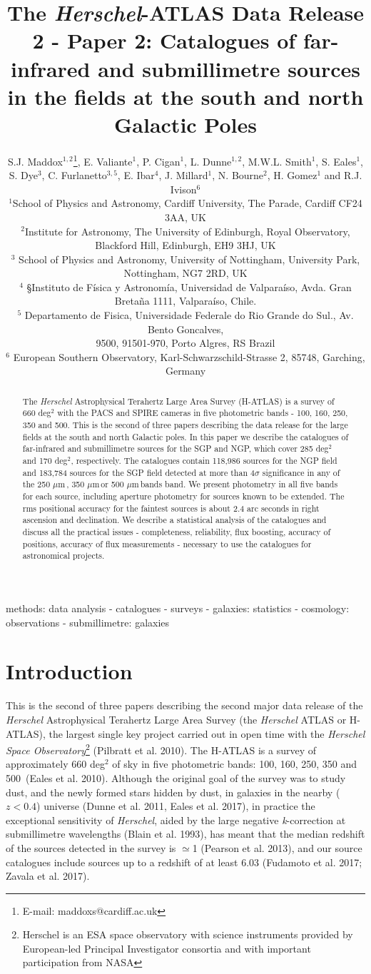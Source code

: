 \documentclass[useAMS,usenatbib]{mnras}
\title[The \textit{Herschel}-ATLAS Data Release 2]{The
  \textit{Herschel}-ATLAS Data Release 2 - Paper 2: Catalogues of
  far-infrared and submillimetre sources in the fields at the south
  and north Galactic Poles}
\author[S.J. Maddox]{S.J. Maddox$^{1,2}$\thanks{E-mail:
    maddoxs@cardiff.ac.uk}, E. Valiante$^1$, P. Cigan$^1$, 
  L. Dunne$^{1,2}$,
  \textsc{}\newauthor M.W.L. Smith$^1$, S. Eales$^1$, S. Dye$^3$,
  C. Furlanetto$^{3,5}$, E. Ibar$^4$, \newauthor
  J. Millard$^1$, N. Bourne$^2$, H. Gomez$^1$ and R.J. Ivison$^6$\\
  $^{1}$School of Physics and Astronomy, Cardiff University, The Parade, Cardiff CF24 3AA, UK\\
  $^2$Institute for Astronomy, The University of Edinburgh, Royal
  Observatory, Blackford Hill,
  Edinburgh, EH9 3HJ, UK\\
  $^3$ School of Physics and Astronomy, University of Nottingham,
  University Park, Nottingham,
  NG7 2RD, UK\\
  $^4$ §Instituto de F\'isica y Astronom\'ia, Universidad de Valpara\'iso, Avda. Gran Breta\~na 1111, Valpara\'iso, Chile.\\
  $^5$ Departamento de Fisica, Universidade Federale do Rio Grande do Sul., Av. Bento Goncalves,\\
  9500, 91501-970, Porto Algres, RS Brazil\\
  $^6$ European Southern Observatory, Karl-Schwarzschild-Strasse 2,
  85748, Garching, Germany}
\date{}
\def\mic{ $\mu $m\,}
\begin{document}
\label{firstpage}
\pagerange{\pageref{firstpage}--\pageref{lastpage}}
\maketitle


\begin{abstract}

The {\it Herschel} Astrophysical Terahertz Large Area Survey
(H-ATLAS) is a survey of 660 deg$^2$ with the PACS and SPIRE cameras
in five photometric bands - 100, 160, 250, 350 and 500\micron.
This is the second of three papers describing the data release
for the large fields at the south and north Galactic poles.
In this paper
we describe the catalogues of far-infrared and submillimetre
sources for the SGP and NGP, which cover 285 deg$^2$ and 170 deg$^2$,
respectively.
The catalogues contain
118,986 sources for the NGP field and 183,784 sources for the
SGP field detected at
more than 4$\sigma$ significance in any of the 250\mic, 350\mic or
500\mic bands band. We present photometry in all five bands for
each source, including aperture photometry for sources known to
be extended. 
The rms positional accuracy for the faintest
sources is about 2.4 arc seconds in right ascension and
declination.
We describe a statistical analysis of the catalogues
and discuss all the practical issues - completeness, reliability,
flux boosting, accuracy of positions, accuracy of flux measurements - necessary to
use the catalogues for astronomical projects.
\end{abstract}

\begin{keywords}
methods: data analysis - catalogues - surveys - galaxies: statistics - cosmology:
observations - submillimetre: galaxies
\end{keywords}

\section{Introduction}

This is the second of three papers describing the second major data
release of the {\it Herschel} Astrophysical Terahertz Large Area
Survey (the {\it Herschel} ATLAS or H-ATLAS), the largest single key
project carried out in open time with the {\it Herschel Space
  Observatory}\footnote{Herschel is an ESA space observatory with
  science instruments provided by European-led Principal Investigator
  consortia and with important participation from NASA} (Pilbratt et
al.  2010).  The H-ATLAS is a survey of approximately 660 deg$^2$ of
sky in five photometric bands: 100, 160, 250, 350 and 500\micron\
(Eales et al.  2010).  Although the original goal of the survey was to
study dust, and the newly formed stars hidden by dust, in galaxies in
the nearby ($z<0.4$) universe (Dunne et al. 2011, Eales et al. 2017),
in practice the exceptional sensitivity of {\it Herschel}, aided by
the large negative {\it k}-correction at submillimetre wavelengths
(Blain et al. 1993), has meant that the median redshift of the sources
detected in the survey is $\simeq$1 (Pearson et al. 2013), and our
source catalogues include sources up to a redshift of at least 6.03
(Fudamoto et al. 2017; Zavala et al. 2017).
\end{document}
